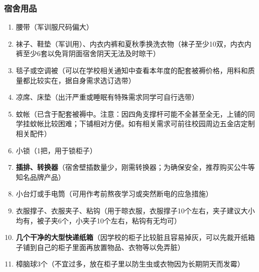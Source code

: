 \subsubsection[宿舍用品]{宿舍用品}
\begin{enumerate}
    \item 腰带（军训服尺码偏大）
    \item 袜子、鞋垫（军训用）、内衣内裤和夏秋季换洗衣物（袜子至少10双，内衣内裤至少6套以免背阴面宿舍阴天无法及时晾干）
    \item 毯子或空调被（可以在学校相关通知中查看本年度的配套被褥\footnotemark 价格，用料和质量都比较实在，据自身需求选订选带）
    \item 凉席、床垫\footnotemark（出汗严重或睡眠有特殊需求同学可自行选带）
    \item 蚊帐（已含于配套被褥中。注意：因四角支撑杆可能不全甚至全无，上铺的同学挂蚊帐比较困难；下铺相对方便。如有相关需求可前往校园周边五金店定制相关配件）
    \item 小锁（1把，用于锁柜子）
    \item \textbf{插排、转换器}（宿舍壁插数量少，刚需转换器；为确保安全，推荐购买公牛等知名品牌产品）
    \item 小台灯或手电筒（可用作考前熬夜学习或突然断电的应急措施）
    \item 衣服撑子、衣服夹子、粘钩（用于晾衣服，衣服撑子10个左右，夹子建议大小均有，被子夹6个，小夹子10个左右，粘钩有无均可）
    \item \textbf{几个干净的大型快递纸箱}（因学校的柜子比较脏且容易掉灰，可以先裁开纸箱子铺到自己的柜子里面再放置物品、衣物等以免弄脏）
    \item 樟脑球3个（不宜过多，放在柜子里以防生虫或衣物因为长期阴天而发霉）
\end{enumerate}

